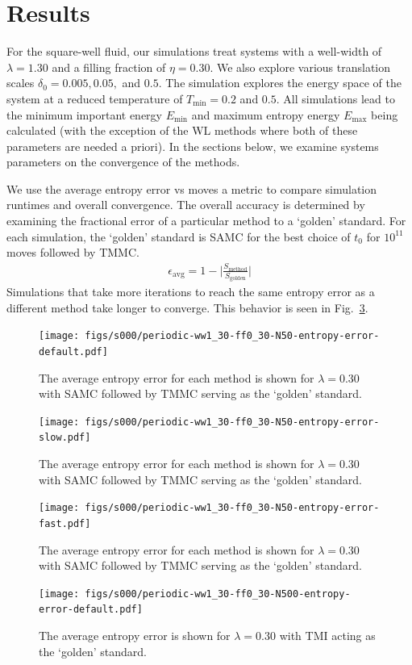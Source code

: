 \documentclass[letterpaper,twocolumn,amsmath,amssymb,pre,aps,10pt]{revtex4-1}
\begin{document}
\section{Results}\label{sec:results}

For the square-well fluid, our simulations treat systems with a
well-width of $\lambda = 1.30$ and a filling fraction of
$\eta = 0.30$. We also explore various translation scales $\delta_0 = 0.005,
0.05,$ and $0.5$. The simulation explores the
energy space of the system at a reduced temperature of
$T_{\text{min}} = 0.2$ and $0.5$.  All simulations lead to the minimum important
energy $E_{\min}$ and maximum entropy energy $E_{\max}$
being calculated (with the exception of the WL methods where both
of these parameters are needed a priori).  In the sections below, we
examine systems parameters on the convergence of the methods.

We use the average entropy error vs moves a metric to compare
simulation runtimes and overall convergence. The overall accuracy
is determined by examining the fractional error of a particular method to
a `golden' standard. For each simulation, the `golden' standard is
SAMC for the best choice of $t_0$ for $10^{11}$ moves followed by TMMC.
\begin{align}
\epsilon_\text{avg} = 1 - \bigg\lvert\frac{S_\text{method}}{S_\text{golden}}\bigg\rvert
\end{align}
Simulations that take more iterations to reach the same entropy error as a
different method take longer to converge. This behavior is seen in
Fig.~\ref{fig:N50-ff0.3-avg-error}.

\begin{figure}
  \texttt{[image: figs/s000/periodic-ww1\_30-ff0\_30-N50-entropy-error-default.pdf]}
  \caption{The average entropy error for each method is shown for $\lambda = 0.30$ with
  SAMC followed by TMMC serving as the `golden'
  standard.}\label{fig:N50-ff0.3-avg-error}
\end{figure}
\begin{figure}
  \texttt{[image: figs/s000/periodic-ww1\_30-ff0\_30-N50-entropy-error-slow.pdf]}
  \caption{The average entropy error for each method is shown for $\lambda = 0.30$ with
  SAMC followed by TMMC serving as the `golden'
  standard.}\label{fig:N50-ff0.3-avg-error}
\end{figure}
\begin{figure}
  \texttt{[image: figs/s000/periodic-ww1\_30-ff0\_30-N50-entropy-error-fast.pdf]}
  \caption{The average entropy error for each method is shown for $\lambda = 0.30$ with
  SAMC followed by TMMC serving as the `golden'
  standard.}\label{fig:N50-ff0.3-avg-error}
\end{figure}
\begin{figure}
\texttt{[image: figs/s000/periodic-ww1\_30-ff0\_30-N500-entropy-error-default.pdf]}
  \caption{The average entropy error is shown for $\lambda = 0.30$ with TMI acting as the
  `golden' standard.}\label{fig:n500-ff0.3}
\end{figure}
\end{document}
